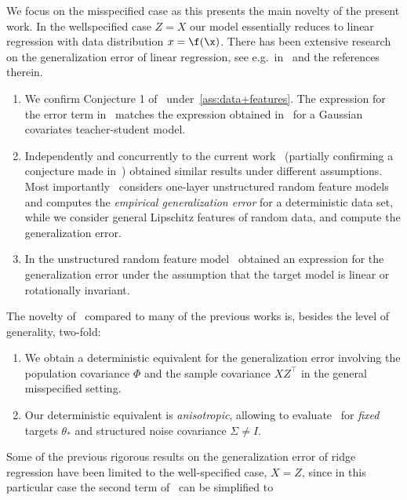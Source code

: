 \begin{remark}
    We focus on the misspecified case as this presents the main novelty of the present work. In the wellspecified case $Z=X$ our model essentially reduces to linear regression with data distribution $x=\f(\x)$. There has been extensive research on the generalization error of linear regression, see e.g.\ in~\cite{2303.01372,Dobriban2015HighDimensionalAO,2103.09177,2210.08571} and the references therein. 
    \begin{enumerate}[label=(\alph*)]
        \item We confirm Conjecture 1 of~\cite{Loureiro2021CapturingTL} under~\cref{ass:data+features}. The expression for the error term in~ matches the expression obtained in~\cite{Loureiro2021CapturingTL} for a Gaussian covariates teacher-student model. 
        \item Independently and concurrently to the current work~\cite{2312.09194} (partially confirming a conjecture made in~\cite{louart2018random}) obtained similar results under different assumptions. Most importantly~\cite{2312.09194} considers one-layer unstructured random feature models and computes the \emph{empirical generalization error} for a deterministic data set, while we consider general Lipschitz features of random data, and compute the generalization error. 
        \item In the unstructured random feature model~\cite{Mei2021GeneralizationEO,2008.06786} obtained an expression for the generalization error under the assumption that the target model is linear or rotationally invariant. 
    \end{enumerate}
\end{remark}
The novelty of~ compared to many of the previous works is, besides the level of generality, two-fold:
\begin{enumerate}[label=(\roman*)]
    \item\label{gen error det equ} We obtain a deterministic equivalent for the generalization error involving the population covariance $\Phi$ and the sample covariance $XZ^\top$ in the general misspecified setting.
    \item\label{anisotropic det equ} Our deterministic equivalent is \emph{anisotropic}, allowing to evaluate~ for \emph{fixed} targets $\theta_\ast$ and structured noise covariance $\Sigma\ne I$.
\end{enumerate}
Some of the previous rigorous results on the generalization error of ridge regression have been limited to the well-specified case, $X=Z$, since in this particular case the second term of~ can be simplified to 
